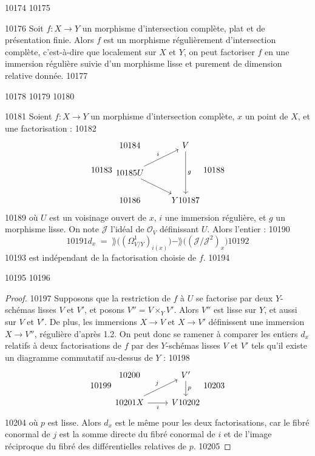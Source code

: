  10174	
 10175	\begin{proposition}[1.7]%
 10176	Soit $f : X \to Y$ un morphisme d'intersection complète, plat et de présentation finie. Alors $f$ est un morphisme régulièrement d'intersection complète, c'est-à-dire que localement sur $X$ et $Y$, on peut factoriser $f$ en une immersion régulière suivie d'un morphisme lisse et purement de dimension relative donnée.
 10177	\end{proposition}
 10178	
 10179	
 10180	\begin{proposition}[1.8]%
 10181	Soient $f : X \to Y$ un morphisme d'intersection complète, $x$ un point de $X$, et une factorisation :
 10182	\[
 10183	\begin{tikzcd}
 10184	& V \arrow[dd, "g"] \\
 10185	U \arrow[ru, "i"] \arrow[rd] & \\
 10186	& Y
 10187	\end{tikzcd}
 10188	\]
 10189	où $U$ est un voisinage ouvert de $x$, $i$ une immersion régulière, et $g$ un morphisme lisse. On note $\mathscr{J}$ l'idéal de $\mathscr{O}_V$ définissant $U$. Alors l'entier :
 10190	\[
 10191	d_x \; = \; \rang\bigl((\Omega^1_{V/Y})_{i(x)}\bigr) - \rang\bigl((\mathscr{J}/\mathscr{J}^2)_x\bigr)
 10192	\]
 10193	est indépendant de la factorisation choisie de $f$.
 10194	\end{proposition}
 10195	
 10196	\begin{proof}
 10197	Supposons que la restriction de $f$ à $U$ se factorise par deux $Y$-schémas lisses $V$ et $V'$, et posons $V'' = V \times_Y V'$. Alors $V''$ est lisse sur $Y$, et aussi sur $V$ et $V'$. De plus, les immersions $X \to V$ et $X \to V'$ définissent une immersion $X \to V''$, régulière d'après 1.2. On peut donc se ramener à comparer les entiers $d_x$ relatifs à deux factorisations de $f$ par des $Y$-schémas lisses $V$ et $V'$ tels qu'il existe un diagramme commutatif au-dessus de $Y$ :
 10198	\[
 10199	\begin{tikzcd}
 10200	& V' \arrow[d, "p"] \\
 10201	X \arrow[r, "i"'] \arrow[ru, "j"] & V
 10202	\end{tikzcd}
 10203	\]
 10204	où $p$ est lisse. Alors $d_x$ est le même pour les deux factorisations, car le fibré conormal de $j$ est la somme directe du fibré conormal de $i$ et de l'image réciproque du fibré des différentielles relatives de $p$.
 10205	\end{proof}
